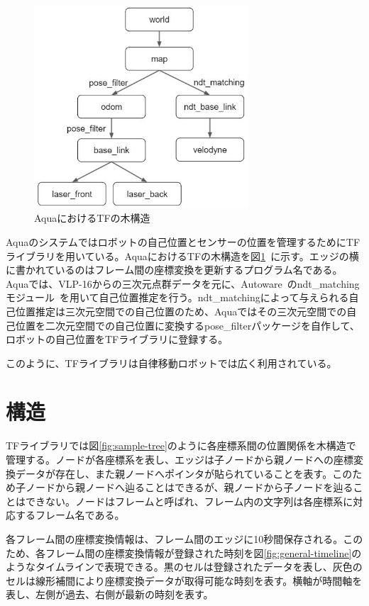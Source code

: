 \documentclass[a4paper]{jreport}	%
\begin{document}
\begin{figure}[h] 
\centering
\includegraphics[width=8cm]{aqua-tf.jpeg}	
\caption{AquaにおけるTFの木構造}
\label{fig:aqua-tf}
\end{figure}

Aquaのシステムではロボットの自己位置とセンサーの位置を管理するためにTFライブラリを用いている。AquaにおけるTFの木構造を図\ref{fig:aqua-tf}~\cite{Aqua}に示す。エッジの横に書かれているのはフレーム間の座標変換を更新するプログラム名である。  Aquaでは、VLP-16からの三次元点群データを元に、Autoware~\cite{autoware}のndt\_matchingモジュール~\cite{ndt_matching}を用いて自己位置推定を行う。ndt\_matchingによって与えられる自己位置推定は三次元空間での自己位置のため、Aquaではその三次元空間での自己位置を二次元空間での自己位置に変換するpose\_filterパッケージを自作して、ロボットの自己位置をTFライブラリに登録する。

このように、TFライブラリは自律移動ロボットでは広く利用されている。

\section{構造}
TFライブラリでは図\ref{fig:sample-tree}のように各座標系間の位置関係を木構造で管理する。ノードが各座標系を表し、エッジは子ノードから親ノードへの座標変換データが存在し、また親ノードへポインタが貼られていることを表す。このため子ノードから親ノードへ辿ることはできるが、親ノードから子ノードを辿ることはできない。ノードはフレームと呼ばれ、フレーム内の文字列は各座標系に対応するフレーム名である。

各フレーム間の座標変換情報は、フレーム間のエッジに10秒間保存される。このため、各フレーム間の座標変換情報が登録された時刻を図\ref{fig:general-timeline}のようなタイムラインで表現できる。黒のセルは登録されたデータを表し、灰色のセルは線形補間により座標変換データが取得可能な時刻を表す。横軸が時間軸を表し、左側が過去、右側が最新の時刻を表す。
\end{document}
